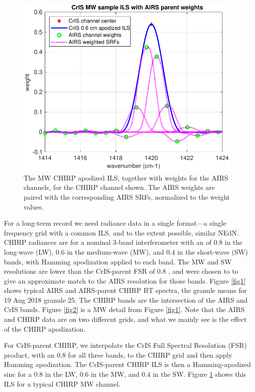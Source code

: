 \documentclass[12pt]{article}
\begin{document}
\begin{figure} %
  \centering
  \includegraphics[height=9cm]{figures/sample_CrIS_ILS_with_AIRS_parent_SRFs.pdf}
  \caption{The MW CHIRP apodized ILS, together with weights for the
    AIRS channels, for the CHIRP channel shown.  The AIRS weights
    are paired with the corresponding AIRS SRFs, normalized to the
    weight values.}
  \label{fig3}
\end{figure}

For a long-term record we need radiance data in a single format---a
single frequency grid with a common ILS, and to the extent possible,
similar NEdN.  CHIRP radiances are for a nominal 3-band
interferometer with an {\opd} of $0.8$ {\cm} in the long-wave (LW),
$0.6$ {\cm} in the medium-wave (MW), and $0.4$ {\cm} in the
short-wave (SW) bands, with Hamming apodization applied to each band.
The MW and SW resolutions are lower than the CrIS-parent FSR {\opd}
of $0.8$ {\cm}, and were chosen to to give an approximate match to
the AIRS resolution for those bands.  Figure \ref{fig1} shows
typical AIRS and AIRS-parent CHIRP BT spectra, the granule means for
19 Aug 2018 granule 25.  The CHIRP bands are the intersection of the
AIRS and CrIS bands.  Figure \ref{fig2} is a MW detail from Figure
\ref{fig1}.  Note that the AIRS and CHIRP data are on two different
grids, and what we mainly see is the effect of the CHIRP
apodization.

For CrIS-parent CHIRP, we interpolate the CrIS Full Spectral
Resolution (FSR) product, with an $0.8$ {\cm} {\opd} for all three
bands, to the CHIRP grid and then apply Hamming apodization.  The
CrIS-parent CHIRP ILS is then a Hamming-apodized sinc for a $0.8$
{\cm} {\opd} in the LW, $0.6$ {\cm} in the MW, and $0.4$ {\cm} in
the SW.  Figure \ref{fig3} shows this ILS for a typical CHIRP MW
channel.
\end{document}
